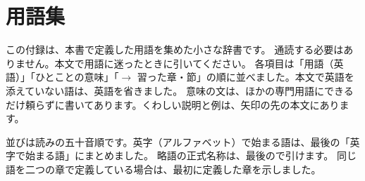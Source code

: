 \chapter{用語集}\label{app:glossary}
\newcommand{\gitem}[4]{\item[#1]（#2）\enspace #3\enspace $\to$ #4}
\newcommand{\gitemj}[3]{\item[#1]\enspace #2\enspace $\to$ #3}

この付録は、本書で定義した用語を集めた小さな辞書です。
通読する必要はありません。本文で用語に迷ったときに引いてください。
各項目は「用語（英語）」「ひとことの意味」「$\to$ 習った章・節」の順に並べました。本文で英語を添えていない語は、英語を省きました。
意味の文は、ほかの専門用語にできるだけ頼らずに書いてあります。くわしい説明と例は、矢印の先の本文にあります。

並びは読みの五十音順です。英字（アルファベット）で始まる語は、最後の「英字で始まる語」にまとめました。
略語の正式名称は、最後ので引けます。
同じ語を二つの章で定義している場合は、最初に定義した章を示しました。

